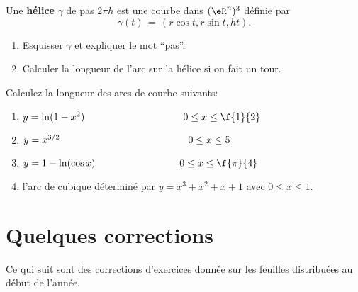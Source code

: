 \exerNico
Une {\bf hélice} $\gamma$ de pas $2 \pi h$ est une courbe dans $(\eR^n)^3$ définie par
$$
\gamma (t) \,=\, \left( r \cos t , r \sin t , h t \right)  .
$$

\begin{enumerate}
\item Esquisser $\gamma$ et expliquer le mot ``pas''.

\item Calculer la longueur de l'arc sur la hélice si on fait un tour.
\end{enumerate}

\exerNico Calculez la longueur des arcs de courbe suivants:
\begin{enumerate}
\item $y= \ln(1-x^2)  \hspace{3.5cm} 0\leq x\leq \f{1}{2}$
\item  $y= x^{3/2}  \hspace{4.57cm} 0\leq x\leq 5$
\item $y = 1-\ln(\cos x) \hspace{3cm} 0\leq x \leq \f{\pi}{4}$
\item l'arc de cubique déterminé par $y=x^3+x^2+x+1$ avec $0\leq x \leq 1$.
\end{enumerate}


\section{Quelques corrections}

Ce qui suit sont des corrections d'exercices donnée sur les feuilles distribuées au début de l'année.

